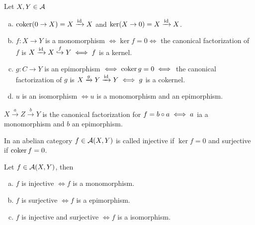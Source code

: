 \documentclass[a4paper]{report}
\begin{document}
\begin{prop}
  Let $X, Y \in \mathcal{A}$
  \begin{enumerate}[(a)]
    \item $\operatorname{coker} (0 \to X) = X \xrightarrow {\operatorname{id}} X$ and $\ker(X \to 0) = X \xrightarrow {\operatorname{id}} X$.
    \item $f: X \to Y$ is a monomorphism $\iff \ker f = 0 \iff$ the canonical factorization of $f$ is $X \xrightarrow {\operatorname{id}} X \overset f \hookrightarrow Y \iff f$ is a kernel.
    \item $g: C \to Y$ is an epimorphism $\iff \operatorname{coker} g= 0 \iff$ the canonical factorization of $g$ is $X \xrightarrow g Y \xrightarrow {\operatorname{id}} Y \iff g$ is a cokernel.
          \item $u$ is an isomorphism $\iff u$ is a monomorphism and an epimorphism.
  \end{enumerate}
\end{prop}


\begin{cor}
$X \xrightarrow a Z \xrightarrow b Y$ is the canonical factorization for $f = b \circ a \iff a$  ia a monomorphism and $b$ an epimorphism.
\end{cor}

\begin{defi}
In an abelian category $f \in \mathcal{A}(X,Y)$ is called injective if $\ker f = 0$ and surjective if $\operatorname{coker} f = 0$.
\end{defi}

\begin{cor}
  Let $f \in \mathcal{A}(X,Y)$, then
 \begin{enumerate}[(a)]
\item $f$ is injective $\iff f$ is a monomorphism.
\item $f$ is surjective $\iff f$ is a epimorphism.
\item $f$ is injective and surjective $\iff f$ is a isomorphism.
 \end{enumerate}
\end{cor}
\end{document}
